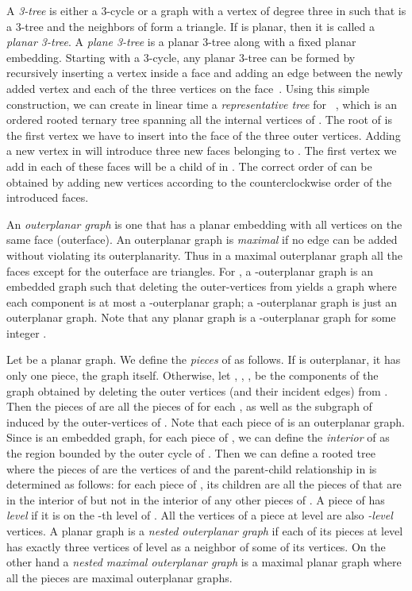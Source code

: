 \documentclass{llncs}
\begin{document}
A \textit{3-tree} is either a 3-cycle or a graph  with a vertex  of degree three in 
 such that  is a 3-tree and the neighbors of  form a triangle. If  is planar, then
 it is called a \textit{planar 3-tree}. A \textit{plane 3-tree} is a planar 3-tree along with a fixed
 planar embedding. Starting with a 3-cycle, any planar 3-tree can be
 formed by recursively inserting a vertex inside a face and adding an edge between the newly
 added vertex and each of the three vertices on the face~\cite{BE09,MNRA10}.
 Using this simple construction, we can create in linear time a {\em representative tree} for
 ~\cite{MNRA10}, which is an ordered rooted ternary tree  spanning all the internal
 vertices of . The root of  is the first vertex we have to insert into the face of the three
 outer vertices. Adding a new vertex  in  will introduce three new faces belonging to
 . The first vertex  we add in each of these faces will be a child of  in . The
 correct order of  can be obtained by adding new vertices according to the
 counterclockwise order of the introduced faces. 




An \textit{outerplanar graph} is one that has a planar embedding with all vertices
 on the same face (outerface). An outerplanar graph is \textit{maximal} if no edge can be added without violating its outerplanarity. Thus in a maximal outerplanar graph
 all the faces except for the outerface are triangles.
For , a -outerplanar
 graph  is an embedded graph such that deleting the outer-vertices from  yields a graph
 where each component is at most a -outerplanar graph; a -outerplanar graph is just an outerplanar graph.  Note that any planar graph is a
 -outerplanar graph for some integer . 


Let  be a planar graph. We define the \textit{pieces} of  as follows. If  is
 outerplanar, it has only one piece, the graph itself. Otherwise, let , , ,
  be the components of the graph obtained by deleting the outer vertices (and their
 incident edges) from . Then the pieces of  are all the pieces of  for each
 , as well as the subgraph of  induced by the outer-vertices
 of . Note that each piece of  is an outerplanar graph. Since  is an
 embedded graph, for each piece  of , we can define the \textit{interior} of 
 as the region bounded by the outer cycle of . Then we can define a rooted tree
  where the pieces of  are the vertices of  and the
 parent-child relationship in  is determined as follows: for each piece
  of , its children are all the pieces of  that are in the interior of  but
 not in the interior of any other pieces of . A piece of  has \textit{level} 
 if it is on the -th level of . All the vertices of a piece
 at level  are also \textit{-level} vertices. A planar graph is a \textit{nested outerplanar
 graph} if each of its pieces at level  has exactly three vertices of level  as
 a neighbor of some of its vertices. On the other hand a \textit{nested maximal outerplanar
 graph} is a maximal planar graph where all the pieces are maximal outerplanar graphs.
\end{document}
